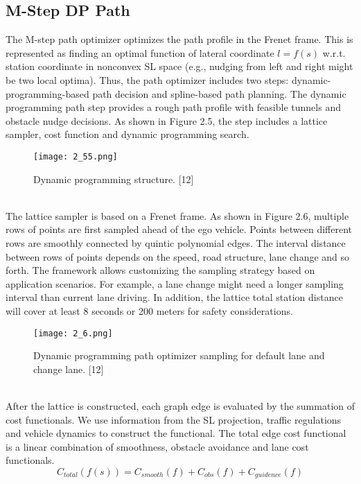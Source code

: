 \documentclass{report}
\begin{document}
 \subsection{M-Step DP Path}
 The M-step path optimizer optimizes the path profile in the Frenet frame. This is represented as finding an optimal function of lateral coordinate $l = f(s)$ w.r.t. station coordinate in nonconvex SL space (e.g., nudging from left and right might be two local optima). Thus, the path optimizer includes two steps: dynamic-programming-based path decision and spline-based path planning. The dynamic
 programming path step provides a rough path profile with feasible tunnels and obstacle nudge decisions. As shown in Figure 2.5, the step includes a lattice sampler, cost function and dynamic programming search.
   \begin{figure}[ht]
 	\centering
 	\texttt{[image: 2\_55.png]}
 	\caption{Dynamic programming structure. [12]}
 	\label{fig:2.5} 
 \end{figure} \\
\indent
The lattice sampler is based on a Frenet frame. As shown in Figure 2.6, multiple rows of points are first sampled ahead of the ego vehicle. Points between different rows are smoothly connected by quintic polynomial edges. The interval distance between rows of points depends on the speed, road structure, lane change and so forth. The framework allows customizing the sampling strategy based on application scenarios. For example, a lane change might need a longer sampling interval than current lane driving. In addition, the lattice total station distance will cover at least 8 seconds or 200 meters for safety considerations.
   \begin{figure}[ht]
	\centering
	\texttt{[image: 2\_6.png]}
	\caption{Dynamic programming path optimizer sampling for default lane and change lane. [12]}
	\label{fig:2.6} 
\end{figure} \\
\indent
After the lattice is constructed, each graph edge is evaluated by the summation of cost functionals. We use information from the SL projection, traffic regulations and vehicle dynamics to construct the functional. The total edge cost functional is a linear combination of smoothness, obstacle avoidance and lane cost functionals.
\begin{equation}
C_{total}(f(s)) = C_{smooth}(f) + C_{obs}(f)+ C_{guidence}(f)
\end{equation}\\
\end{document}
